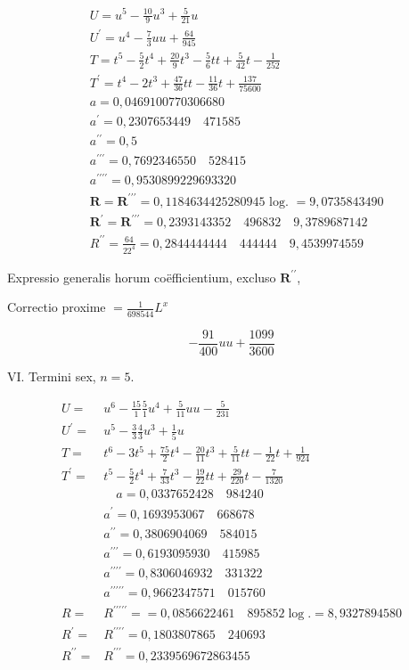 \documentclass[10pt]{article}
\begin{document}
\[
\begin{aligned}
& U=u^{5}-\frac{10}{9} u^{3}+\frac{5}{21} u \\
& U^{\prime}=u^{4}-\frac{7}{3} u u+\frac{64}{945} \\
& T=t^{5}-\frac{5}{2} t^{4}+\frac{20}{9} t^{3}-\frac{5}{6} t t+\frac{5}{42} t-\frac{1}{252} \\
& T^{\prime}=t^{4}-2 t^{3}+\frac{47}{36} t t-\frac{11}{36} t+\frac{137}{75600} \\
& a=0,0469100770306680 \\
& a^{\prime}=0,2307653449 \quad 471585 \\
& a^{\prime \prime}=0,5 \\
& a^{\prime \prime \prime}=0,7692346550 \quad 528415 \\
& a^{\prime \prime \prime \prime}=0,9530899229693320 \\
& \boldsymbol{R}=\boldsymbol{R}^{\prime \prime \prime}=0,1184634425280945 \text { log. }=9,0735843490 \\
& \boldsymbol{R}^{\prime}=\boldsymbol{R}^{\prime \prime \prime}=0,2393143352 \quad 496832 \quad 9,3789687142 \\
& R^{\prime \prime}=\frac{64}{22^{4}}=0,2844444444 \quad 444444 \quad 9,4539974559
\end{aligned}
\]

Expressio generalis horum coëfficientium, excluso \(\boldsymbol{R}^{\prime \prime}\),

Correctio proxime \(=\frac{1}{698544} L^{x}\)

\[
-\frac{91}{400} u u+\frac{1099}{3600}
\]

VI. Termini sex, \(n=5\).

\[
\begin{aligned}
U= & u^{6}-\frac{15}{1} \frac{5}{1} u^{4}+\frac{5}{11} u u-\frac{5}{231} \\
U^{\prime}= & u^{5}-\frac{3}{3} \frac{4}{3} u^{3}+\frac{1}{5} u \\
T= & t^{6}-3 t^{5}+\frac{75}{2} t^{4}-\frac{20}{11} t^{3}+\frac{5}{11} t t-\frac{1}{22} t+\frac{1}{924} \\
T^{\prime}= & t^{5}-\frac{5}{2} t^{4}+\frac{7}{33} t^{3}-\frac{19}{22} t t+\frac{29}{220} t-\frac{7}{1320} \\
& \quad a=0,0337652428 \quad 984240 \\
& a^{\prime}=0,1693953067 \quad 668678 \\
& a^{\prime \prime}=0,3806904069 \quad 584015 \\
& a^{\prime \prime \prime}=0,6193095930 \quad 415985 \\
& a^{\prime \prime \prime \prime}=0,8306046932 \quad 331322 \\
& a^{\prime \prime \prime \prime \prime}=0,9662347571 \quad 015760 \\
R= & R^{\prime \prime \prime \prime \prime}==0,0856622461 \quad 895852 \log .=8,9327894580 \\
R^{\prime}= & R^{\prime \prime \prime \prime}=0,1803807865 \quad 240693 \\
R^{\prime \prime}= & R^{\prime \prime \prime}=0,2339569672863455
\end{aligned}
\]
\end{document}
